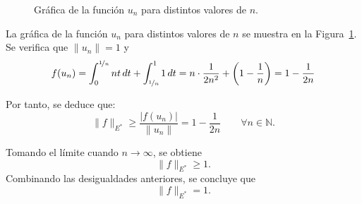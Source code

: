 \documentclass[12pt]{article}
\begin{document}
\begin{ejercicio}[2.5 puntos]
\begin{enumerate}[label=\alph*)]
\begin{figure}[h]
                    \caption{Gráfica de la función $u_n$ para distintos valores de $n$.}
                    \label{fig:funciones_un}
                \end{figure}

                La gráfica de la función $u_n$ para distintos valores de $n$ se muestra en la Figura~\ref{fig:funciones_un}. Se verifica que $\|u_n\|=1$ y
                \begin{equation*}
                    f(u_n)
                    =\int_0^{\nicefrac{1}{n}} nt\,dt+\int_{\nicefrac{1}{n}}^1 1\,dt
                    =n\cdot \frac{1}{2n^2}+\left(1-\frac{1}{n}\right)
                    =1-\frac{1}{2n}
                \end{equation*}

                Por tanto, se deduce que:
                \begin{equation*}
                    \|f\|_{E^\ast}\geq \frac{|f(u_n)|}{\|u_n\|} = 1-\frac{1}{2n} \qquad \forall n\in\mathbb{N}.
                \end{equation*}

                Tomando el límite cuando $n\to\infty$, se obtiene
                \begin{equation*}
                    \|f\|_{E^\ast}\geq 1.
                \end{equation*}
                Combinando las desigualdades anteriores, se concluye que
                \begin{equation*}
                    \|f\|_{E^\ast}=1.
                \end{equation*}
                

\end{enumerate}
\end{ejercicio}
\end{document}
